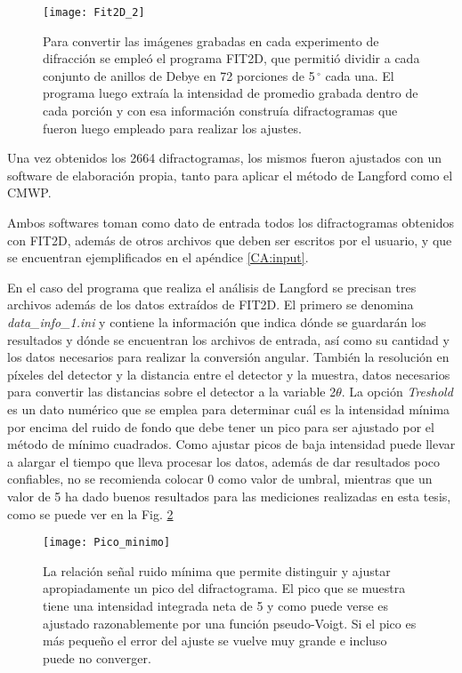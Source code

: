 \begin{figure}[!htb] 
  \centering
  \texttt{[image: Fit2D\_2]}
  \caption{Para convertir las imágenes grabadas en cada experimento de difracción se empleó el programa FIT2D, que permitió dividir a cada conjunto de anillos de Debye en 72 porciones de 5\,$^{\circ}$ cada una. El programa luego extraía la intensidad de promedio grabada dentro de cada porción y con esa información construía difractogramas que fueron luego empleado para realizar los ajustes.}
  \label{fig:fit2d}
\end{figure}

Una vez obtenidos los 2664 difractogramas, los mismos fueron ajustados con un software de elaboración propia, tanto para aplicar el método de Langford como el CMWP.

Ambos softwares toman como dato de entrada todos los difractogramas obtenidos con FIT2D, además de otros archivos que deben ser escritos por el usuario, y que se encuentran ejemplificados en el apéndice \ref{CA:input}.

En el caso del programa que realiza el análisis de Langford se precisan tres archivos además de los datos extraídos de FIT2D.
El primero se denomina \textit{data\_info\_1.ini} y contiene la información que indica dónde se guardarán los resultados y dónde se encuentran los archivos de entrada, así como su cantidad y los datos necesarios para realizar la conversión angular.
También la resolución en píxeles del detector y la distancia entre el detector y la muestra, datos necesarios para convertir las distancias sobre el detector a la variable 2$\theta$.
La opción \textit{Treshold} es un dato numérico que se emplea para determinar cuál es la intensidad mínima por encima del ruido de fondo que debe tener un pico para ser ajustado por el método de mínimo cuadrados. 
Como ajustar picos de baja intensidad puede llevar a alargar el tiempo que lleva procesar los datos, además de dar resultados poco confiables, no se recomienda colocar 0 como valor de umbral, mientras que un valor de 5 ha dado buenos resultados para las mediciones realizadas en esta tesis, como se puede ver en la Fig. \ref{fig:MinIntensity}

\begin{figure}[!htb]
  \centering
  \texttt{[image: Pico\_minimo]}
  \caption{La relación señal ruido mínima que permite distinguir y ajustar apropiadamente un pico del difractograma. El pico que se muestra tiene una intensidad integrada neta de 5 y como puede verse es ajustado razonablemente por una función pseudo-Voigt. Si el pico es más pequeño el error del ajuste se vuelve muy grande e incluso puede no converger.}
  \label{fig:MinIntensity}
\end{figure}


